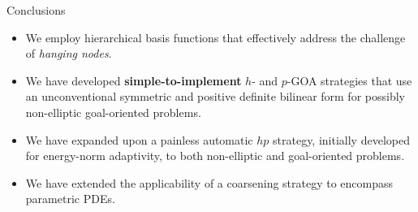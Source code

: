 \begin{frame}{Conclusions}

\begin{itemize}
\item We employ hierarchical basis functions that effectively address the challenge of \emph{hanging nodes}.
\item We have developed \textbf{simple-to-implement} \( h \)- and \( p \)-GOA strategies that use an unconventional symmetric and positive definite bilinear form for possibly non-elliptic goal-oriented problems.
\item We have expanded upon a painless automatic \( hp \) strategy, initially developed for energy-norm adaptivity, to both non-elliptic and goal-oriented problems.
\item We have extended the applicability of a coarsening strategy to encompass parametric PDEs.
\end{itemize}

\end{frame}
